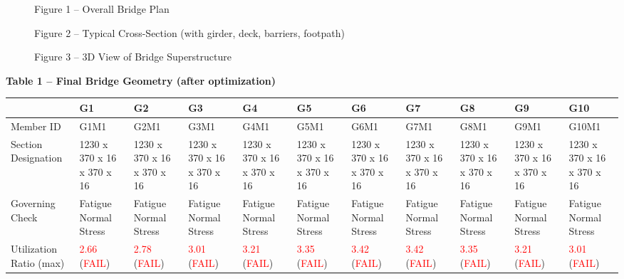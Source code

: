 \documentclass[12pt,a4paper]{report}
\numberwithin{table}{chapter}
\numberwithin{figure}{chapter}
\begin{document}
\begin{figure}[H]
\centering
{}
\caption*{Figure 1 -- Overall Bridge Plan}
\end{figure}

\newpage

\begin{figure}[H]
\centering
{}
\caption*{Figure 2 -- Typical Cross-Section (with girder, deck, barriers, footpath)}
\end{figure}

\begin{figure}[H]
\centering
{}
\caption*{Figure 3 -- 3D View of Bridge Superstructure}
\end{figure}

\par\noindent\begin{minipage}{\textwidth}
\noindent\textbf{Table 1 -- Final Bridge Geometry (after optimization)}

\vspace{0.4em}
\noindent
\begin{tabular}{|C{1.73cm}|C{0.92cm}|C{0.92cm}|C{0.92cm}|C{0.92cm}|C{0.92cm}|C{0.92cm}|C{0.92cm}|C{0.92cm}|C{0.92cm}|C{0.92cm}|}
\hline
  \textbf{} &
  \textbf{G1} &
  \textbf{G2} &
  \textbf{G3} &
  \textbf{G4} &
  \textbf{G5} &
  \textbf{G6} &
  \textbf{G7} &
  \textbf{G8} &
  \textbf{G9} &
  \textbf{G10} \\
\hline
Member ID & G1M1 & G2M1 & G3M1 & G4M1 & G5M1 & G6M1 & G7M1 & G8M1 & G9M1 & G10M1 \\
\hline
Section Designation & 1230 x 370 x 16 x 370 x 16 & 1230 x 370 x 16 x 370 x 16 & 1230 x 370 x 16 x 370 x 16 & 1230 x 370 x 16 x 370 x 16 & 1230 x 370 x 16 x 370 x 16 & 1230 x 370 x 16 x 370 x 16 & 1230 x 370 x 16 x 370 x 16 & 1230 x 370 x 16 x 370 x 16 & 1230 x 370 x 16 x 370 x 16 & 1230 x 370 x 16 x 370 x 16 \\
\hline
Governing Check & Fatigue Normal Stress & Fatigue Normal Stress & Fatigue Normal Stress & Fatigue Normal Stress & Fatigue Normal Stress & Fatigue Normal Stress & Fatigue Normal Stress & Fatigue Normal Stress & Fatigue Normal Stress & Fatigue Normal Stress \\
\hline
Utilization Ratio (max) & \textcolor{red}{2.66} (\textcolor{red}{FAIL}) & \textcolor{red}{2.78} (\textcolor{red}{FAIL}) & \textcolor{red}{3.01} (\textcolor{red}{FAIL}) & \textcolor{red}{3.21} (\textcolor{red}{FAIL}) & \textcolor{red}{3.35} (\textcolor{red}{FAIL}) & \textcolor{red}{3.42} (\textcolor{red}{FAIL}) & \textcolor{red}{3.42} (\textcolor{red}{FAIL}) & \textcolor{red}{3.35} (\textcolor{red}{FAIL}) & \textcolor{red}{3.21} (\textcolor{red}{FAIL}) & \textcolor{red}{3.01} (\textcolor{red}{FAIL}) \\
\hline
\end{tabular}
\end{minipage}
\end{document}
